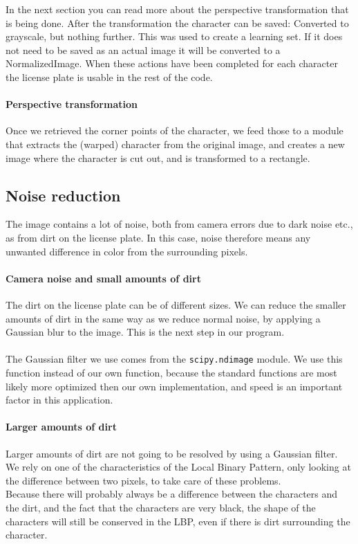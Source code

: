 \documentclass[a4paper]{article}
\begin{document}
In the next section you can read more about the perspective transformation that
is being done. After the transformation the character can be saved: Converted
to grayscale, but nothing further. This was used to create a learning set. If
it does not need to be saved as an actual image it will be converted to a
NormalizedImage. When these actions have been completed for each character the
license plate is usable in the rest of the code.

\paragraph*{Perspective transformation}
Once we retrieved the corner points of the character, we feed those to a
module that extracts the (warped) character from the original image, and
creates a new image where the character is cut out, and is transformed to a
rectangle.

\subsection{Noise reduction}

The image contains a lot of noise, both from camera errors due to dark noise
etc., as from dirt on the license plate. In this case, noise therefore means
any unwanted difference in color from the surrounding pixels.

\paragraph*{Camera noise and small amounts of dirt}
The dirt on the license plate can be of different sizes. We can reduce the
smaller amounts of dirt in the same way as we reduce normal noise, by applying
a Gaussian blur to the image. This is the next step in our program.\\
\\
The Gaussian filter we use comes from the \texttt{scipy.ndimage} module. We use
this function instead of our own function, because the standard functions are
most likely more optimized then our own implementation, and speed is an
important factor in this application.

\paragraph*{Larger amounts of dirt}
Larger amounts of dirt are not going to be resolved by using a Gaussian filter.
We rely on one of the characteristics of the Local Binary Pattern, only looking
at the difference between two pixels, to take care of these problems.\\
Because there will probably always be a difference between the characters and
the dirt, and the fact that the characters are very black, the shape of the
characters will still be conserved in the LBP, even if there is dirt
surrounding the character.
\end{document}
